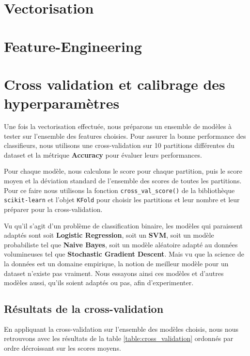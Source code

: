 \documentclass[12pt,a4paper]{report}
\theoremstyle{definition}
\begin{document}
\section{Vectorisation}
\section{Feature-Engineering}
\section{Cross validation et calibrage des hyperparamètres}
Une fois la vectorisation effectuée, nous préparons un ensemble de modèles à tester sur l'ensemble des features choisies. Pour assurer la bonne performance des classifieurs, nous utilisons une cross-validation sur 10 partitions différentes du dataset et la métrique \textbf{Accuracy} pour évaluer leurs performances.

Pour chaque modèle, nous calculons le score pour chaque partition, puis le score moyen et la déviation standard de l'ensemble des scores de toutes les partitions.
Pour ce faire nous utilisons la fonction \texttt{cross\_val\_score()} de la bibliothèque \texttt{scikit-learn} et l'objet \texttt{KFold} pour choisir les partitions et leur nombre et leur préparer pour la cross-validation.

Vu qu'il s'agit d'un problème de classification binaire, les modèles qui paraissent adaptés sont soit \textbf{Logistic Regression}, soit un \textbf{SVM}, soit un modèle probabiliste tel que \textbf{Naive Bayes}, soit un modèle aléatoire adapté au données volumineuses tel que \textbf{Stochastic Gradient Descent}. Mais vu que la science de la données est un domaine empirique, la notion de meilleur modèle pour un dataset n'existe pas vraiment. Nous essayons ainsi ces modèles et d'autres modèles aussi, qu'ils soient adaptés ou pas, afin d'experimenter.

\subsection{Résultats de la cross-validation}
En appliquant la cross-validation sur l’ensemble des modèles choisis, nous nous retrouvons avec les résultats de la table \ref{table:cross_validation} ordonnés par ordre décroissant sur les scores moyens.
\end{document}
